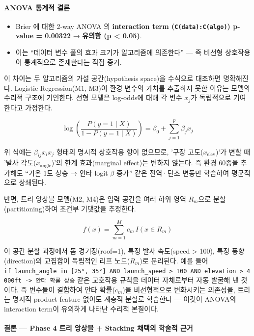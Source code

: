 \documentclass[
  11.5pt,
]{article}
\providecommand{\tightlist}{%
  \setlength{\itemsep}{0pt}\setlength{\parskip}{0pt}}
\begin{document}
\paragraph{ANOVA 통계적
결론}\label{anova-uxd1b5uxacc4uxc801-uxacb0uxb860}

\begin{itemize}
\tightlist
\item
  Brier 에 대한 2-way ANOVA 의 \textbf{interaction term
  (\texttt{C(data):C(algo)}) p-value = 0.00322} → \textbf{유의함 (p
  \textless{} 0.05)}.
\item
  이는 ``데이터 변수 풀의 효과 크기가 알고리즘에 의존한다'' --- 즉
  비선형 상호작용이 통계적으로 존재한다는 직접 증거.
\end{itemize}

이 차이는 두 알고리즘의 가설 공간(hypothesis space)을 수식으로 대조하면
명확해진다. Logistic Regression(M1, M3)이 환경 변수의 가치를 추출하지
못한 이유는 모델의 수리적 구조에 기인한다. 선형 모델은 log-odds에 대해
각 변수 \(x_j\)가 독립적으로 기여한다고 가정한다.

\[\log\left(\frac{P(y=1\mid X)}{1 - P(y=1\mid X)}\right) = \beta_0 + \sum_{j=1}^{p} \beta_j x_j\]

위 식에는 \(\beta_{ij} x_i x_j\) 형태의 명시적 상호작용 항이 없으므로,
'구장 고도(\(x_{\mathrm{elev}}\))'가 변할 때 '발사
각도(\(x_{\mathrm{angle}}\))'의 한계 효과(marginal effect)는 변하지
않는다. 즉 환경 60종을 추가해도 ``기온 1도 상승 → 안타 logit \(\beta\)
증가'' 같은 전역·단조 변동만 학습하여 평균적으로 상쇄된다.

반면, 트리 앙상블 모델(M2, M4)은 입력 공간을 여러 하위 영역 \(R_m\)으로
분할(partitioning)하여 조건부 기댓값을 추정한다.

\[f(x) = \sum_{m=1}^{M} c_m \, I(x \in R_m)\]

이 공간 분할 과정에서 돔 경기장(roof=1), 특정 발사 속도(speed
\textgreater{} 100), 특정 풍향(direction)의 교집합이 독립적인 리프
노드(\(R_m\))로 분리된다. 예를 들어
\texttt{if\ launch\_angle\ in\ {[}25°,\ 35°{]}\ AND\ launch\_speed\ \textgreater{}\ 100\ AND\ elevation\ \textgreater{}\ 4000ft\ -\textgreater{}\ 안타\ 확률\ 상승}
같은 교호작용 규칙을 데이터 자체로부터 자동 발굴해 낸 것이다. 즉
변수들이 결합하여 안타 확률(\(c_m\))을 비선형적으로 변화시키는 의존성을,
트리는 명시적 product feature 없이도 계층적 분할로 학습한다 --- 이것이
ANOVA의 interaction term이 유의하게 나타난 수리적 본질이다.

\paragraph{결론 --- Phase 4 트리 앙상블 + Stacking 채택의 학술적
근거}\label{uxacb0uxb860-phase-4-uxd2b8uxb9ac-uxc559uxc0c1uxbe14-stacking-uxcc44uxd0dduxc758-uxd559uxc220uxc801-uxadfcuxac70}
\end{document}
